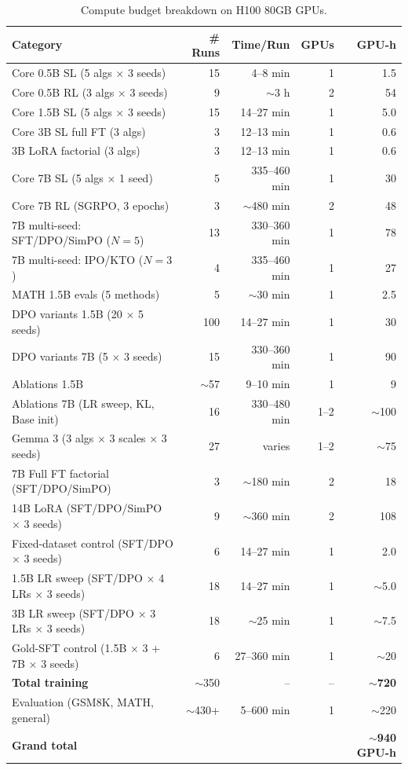 \documentclass{article}
\begin{document}
\begin{table}[ht]
\centering
\caption{Compute budget breakdown on H100 80GB GPUs.}
\label{tab:compute}
\small
\begin{tabular}{@{}lrrrr@{}}
\toprule
\textbf{Category} & \textbf{\# Runs} & \textbf{Time/Run} & \textbf{GPUs} & \textbf{GPU-h} \\
\midrule
Core 0.5B SL (5 algs $\times$ 3 seeds) & 15 & 4--8 min & 1 & 1.5 \\[2pt]
Core 0.5B RL (3 algs $\times$ 3 seeds) & 9 & $\sim$3 h & 2 & 54 \\[2pt]
Core 1.5B SL (5 algs $\times$ 3 seeds) & 15 & 14--27 min & 1 & 5.0 \\[2pt]
Core 3B SL full FT (3 algs) & 3 & 12--13 min & 1 & 0.6 \\[2pt]
3B LoRA factorial (3 algs) & 3 & 12--13 min & 1 & 0.6 \\[2pt]
Core 7B SL (5 algs $\times$ 1 seed) & 5 & 335--460 min & 1 & 30 \\[2pt]
Core 7B RL (SGRPO, 3 epochs) & 3 & $\sim$480 min & 2 & 48 \\[2pt]
7B multi-seed: SFT/DPO/SimPO ($N{=}5$) & 13 & 330--360 min & 1 & 78 \\[2pt]
7B multi-seed: IPO/KTO ($N{=}3$) & 4 & 335--460 min & 1 & 27 \\[2pt]
MATH 1.5B evals (5 methods) & 5 & $\sim$30 min & 1 & 2.5 \\[2pt]
DPO variants 1.5B (20 $\times$ 5 seeds) & 100 & 14--27 min & 1 & 30 \\[2pt]
DPO variants 7B (5 $\times$ 3 seeds) & 15 & 330--360 min & 1 & 90 \\[2pt]
Ablations 1.5B & $\sim$57 & 9--10 min & 1 & 9 \\[2pt]
Ablations 7B (LR sweep, KL, Base init) & 16 & 330--480 min & 1--2 & $\sim$100 \\[2pt]
Gemma 3 (3 algs $\times$ 3 scales $\times$ 3 seeds) & 27 & varies & 1--2 & $\sim$75 \\[2pt]
7B Full FT factorial (SFT/DPO/SimPO) & 3 & $\sim$180 min & 2 & 18 \\[2pt]
14B LoRA (SFT/DPO/SimPO $\times$ 3 seeds) & 9 & $\sim$360 min & 2 & 108 \\[2pt]
Fixed-dataset control (SFT/DPO $\times$ 3 seeds) & 6 & 14--27 min & 1 & 2.0 \\[2pt]
1.5B LR sweep (SFT/DPO $\times$ 4 LRs $\times$ 3 seeds) & 18 & 14--27 min & 1 & $\sim$5.0 \\[2pt]
3B LR sweep (SFT/DPO $\times$ 3 LRs $\times$ 3 seeds) & 18 & $\sim$25 min & 1 & $\sim$7.5 \\[2pt]
Gold-SFT control (1.5B $\times$ 3 + 7B $\times$ 3 seeds) & 6 & 27--360 min & 1 & $\sim$20 \\[2pt]
\midrule
\textbf{Total training} & $\sim$350 & -- & -- & $\sim$\textbf{720} \\[2pt]
Evaluation (GSM8K, MATH, general) & $\sim$430+ & 5--600 min & 1 & $\sim$220 \\[2pt]
\midrule
\textbf{Grand total} & & & & $\sim$\textbf{940 GPU-h} \\
\bottomrule
\end{tabular}
\end{table}
\end{document}
